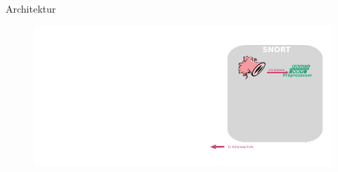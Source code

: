 \begin{frame}{Architektur}
    \begin{figure}
    	\centering
    	\includegraphics[width=\textwidth]{./images/arch/2.pdf}
    \end{figure}
\end{frame}
